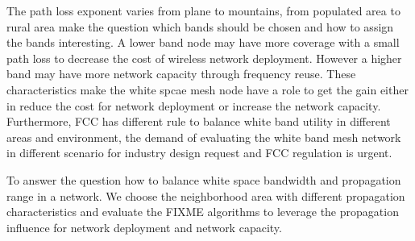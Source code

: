 The path loss exponent varies from plane to mountains, from populated area to rural area make the question which bands should be chosen and how to assign the bands interesting.
A lower band node may have more coverage with a small path loss to decrease the cost of wireless network deployment. However a higher band may have more network capacity through frequency reuse.
These characteristics make the white spcae mesh node have a role to get the gain either in reduce the cost for network deployment or increase the network capacity.
Furthermore, FCC has different rule to balance white band utility in different areas and environment, the demand of evaluating the white band mesh network in different scenario for industry design request and FCC regulation is urgent.

To answer the question how to balance white space bandwidth and propagation range in a network.  
We choose the neighborhood area with different propagation characteristics and evaluate the FIXME algorithms to leverage the propagation influence for network deployment and network capacity.
